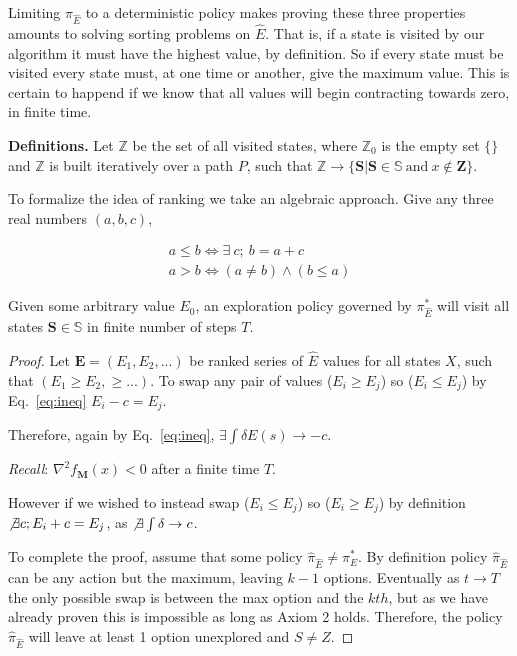 Limiting $\pi_{\hat E}$ to a deterministic policy makes proving these three properties amounts to solving sorting problems on $\hat E$. That is, if a state is visited by our algorithm it must have the highest value, by definition. So if every state must be visited every state must, at one time or another, give the maximum value. This is certain to happend if we know that all values will begin contracting towards zero, in finite time. 

\textbf{Definitions.} Let $\mathbb{Z}$ be the set of all visited states, where $\mathbb{Z}_0$ is the empty set $\{\}$ and $\mathbb{Z}$ is built iteratively over a path $P$, such that $\mathbb{Z} \rightarrow \{\mathbf{S} | \mathbf{S} \in \mathbb{S}\ \text{and}\ x \not\in \mathbf{Z}\}$. 

To formalize the idea of ranking we take an algebraic approach. Give any three real numbers $(a,b,c)$,

\begin{align}\label{eq:ineq} 
	a \leq b \Leftrightarrow \exists \ c;\ b = a + c \\
	a > b \Leftrightarrow (a \neq b) \wedge (b \leq a) 
\end{align}

\begin{theorem} \label{theorem:Z} 
	Given some arbitrary value $E_0$, an exploration policy governed by $\pi^*_{\hat E}$ will visit all states $\mathbf{S} \in \mathbb{S}$ in finite number of steps $T$.
\end{theorem}
\begin{proof}
	Let $\mathbf{E} = (E_1, E_2, ...)$ be ranked series of $\hat E$ values for all states $X$, such that $(E_1 \geq E_2, \geq ...)$. To swap any pair of values ($E_i \geq E_j$) so ($E_i \leq E_j$) by Eq.~\ref{eq:ineq} $E_i - c = E_j$. 
	
	Therefore, again by Eq.~\ref{eq:ineq}, $\exists \int \delta E(s) \rightarrow -c$. 
	
	\textit{Recall}: $\nabla^2 f_{\mathbf{M}}(x) < 0$ after a finite time $T$.
	
	However if we wished to instead swap ($E_i \leq E_j$) so ($E_i \geq E_j$) by definition $\not \exists c; E_i + c = E_j$, as $\not \exists \int \delta \rightarrow c$. 
	
	To complete the proof, assume that some policy $\hat \pi_{\hat E} \neq \pi^*_E$. By definition policy $\hat \pi_{\hat E}$ can be any action but the maximum, leaving $k-1$ options. Eventually as $t \rightarrow T$ the only possible swap is between the max option and the $kth$, but as we have already proven this is impossible as long as Axiom 2 holds. Therefore, the policy $\hat \pi_{\hat E}$ will leave at least 1 option unexplored and $S \neq Z$. 
\end{proof}

